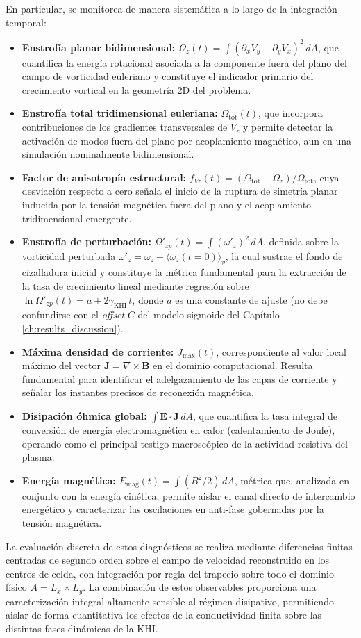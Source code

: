 En particular, se monitorea de manera sistemática a lo largo de la integración temporal:
\begin{itemize}
    \item \textbf{Enstrofía planar bidimensional:} $\Omega_z(t) = \int (\partial_x V_y - \partial_y V_x)^2\, dA$, que cuantifica la energía rotacional asociada a la componente fuera del plano del campo de vorticidad euleriano y constituye el indicador primario del crecimiento vortical en la geometría 2D del problema.
    \item \textbf{Enstrofía total tridimensional euleriana:} $\Omega_{\text{tot}}(t)$, que incorpora contribuciones de los gradientes transversales de $V_z$ y permite detectar la activación de modos fuera del plano por acoplamiento magnético, aun en una simulación nominalmente bidimensional.
    \item \textbf{Factor de anisotropía estructural:} $f_{Vz}(t) = (\Omega_{\text{tot}} - \Omega_z)/\Omega_{\text{tot}}$, cuya desviación respecto a cero señala el inicio de la ruptura de simetría planar inducida por la tensión magnética fuera del plano y el acoplamiento tridimensional emergente.
    \item \textbf{Enstrofía de perturbación:} $\Omega'_{zp}(t) = \int (\omega'_z)^2\, dA$, definida sobre la vorticidad perturbada $\omega'_z = \omega_z - \langle \omega_z(t=0) \rangle_y$, la cual sustrae el fondo de cizalladura inicial y constituye la métrica fundamental para la extracción de la tasa de crecimiento lineal mediante regresión sobre $\ln \Omega'_{zp}(t) = a + 2\gamma_{\text{KHI}}\, t$, donde $a$ es una constante de ajuste (no debe confundirse con el \emph{offset} $C$ del modelo sigmoide del Capítulo \ref{ch:results_discussion}).
    \item \textbf{Máxima densidad de corriente:} $J_{\max}(t)$, correspondiente al valor local máximo del vector $\mathbf{J} = \nabla \times \mathbf{B}$ en el dominio computacional. Resulta fundamental para identificar el adelgazamiento de las capas de corriente y señalar los instantes precisos de reconexión magnética.
    \item \textbf{Disipación óhmica global:} $\int \mathbf{E} \cdot \mathbf{J} \, dA$, que cuantifica la tasa integral de conversión de energía electromagnética en calor (calentamiento de Joule), operando como el principal testigo macroscópico de la actividad resistiva del plasma.
    \item \textbf{Energía magnética:} $E_{\text{mag}}(t) = \int (B^2/2) \, dA$, métrica que, analizada en conjunto con la energía cinética, permite aislar el canal directo de intercambio energético y caracterizar las oscilaciones en anti-fase gobernadas por la tensión magnética.
\end{itemize}
La evaluación discreta de estos diagnósticos se realiza mediante diferencias finitas centradas de segundo orden sobre el campo de velocidad reconstruido en los centros de celda, con integración por regla del trapecio sobre todo el dominio físico $A = L_x \times L_y$. La combinación de estos observables proporciona una caracterización integral altamente sensible al régimen disipativo, permitiendo aislar de forma cuantitativa los efectos de la conductividad finita sobre las distintas fases dinámicas de la KHI.

